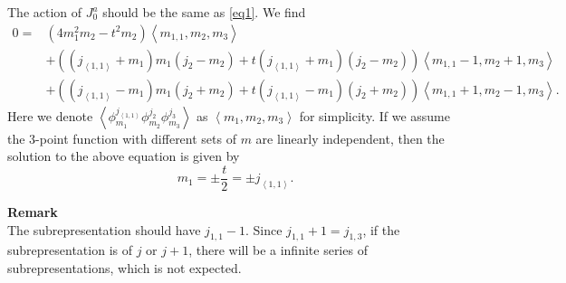 \documentclass[10pt,a4paper]{article}
\numberwithin{equation}{section}
\newcommand{\vev}[1]{\left< #1 \right>}
\begin{document}
The action of $J^{a}_{0}$ should be the same as \ref{eq1}. We find 
\begin{equation}
    \begin{aligned}
    0= &\left(4 m_{1}^{2} m_{2} -t^{2} m_{2} \right) \vev{m_{1,1}, m_{2},m_{3}}\\
      & + \left( (j_{\vev{1,1}}+ m_{1})m_{1} (j_{2}-m_{2}) + t (j_{\vev{1,1}} + m_{1})(j_{2} - m_{2}) \right) \vev{m_{1,1}-1,m_{2}+1, m_{3}} \\
      & + \left( (j_{\vev{1,1}}- m_{1})m_{1} (j_{2}+m_{2}) + t (j_{\vev{1,1}} - m_{1})(j_{2} + m_{2}) \right) \vev{m_{1,1}+1,m_{2}-1, m_{3}}.
    \end{aligned}
\end{equation}
Here we denote $\vev{\phi^{j_{\vev{1,1}}}_{m_{1}} \phi^{j_{2}}_{m_{2}} \phi^{j_{3}}_{m_{3}}}$ as $\vev{m_{1},m_{2},m_{3}}$ for simplicity. 
If we assume the 3-point function with different sets of $m$ are linearly independent, then the solution to the above equation is given by 
\begin{equation}
    m_{1} = \pm \frac{t}{2} = \pm j_{\vev{1,1}}.
\end{equation}

\textbf{Remark}\\
The subrepresentation should have $j_{1,1}-1$. Since $j_{1,1} + 1 = j_{1,3}$, if the subrepresentation is of $j$ or $j+1$, there will be 
a infinite series of subrepresentations, which is not expected.
\end{document}
